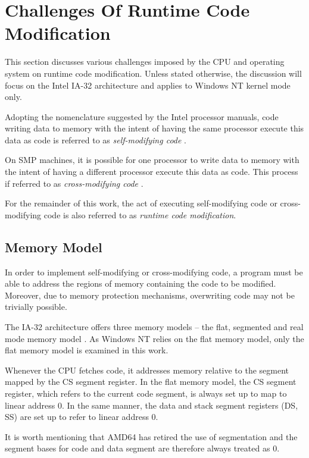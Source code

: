 

\chapter{Challenges Of Runtime Code Modification}
\label{sec:ChallengesOfRuntimeCodeModification}
This section discusses various challenges imposed by the CPU and operating
system on runtime code modification. Unless stated otherwise, the discussion 
will focus on the Intel IA-32 architecture and applies to Windows NT kernel mode only. 

Adopting the nomenclature suggested by the Intel processor manuals, 
code writing data to memory with the intent of having the same processor
execute this data as code is referred to as \emph{self-modifying code} \cite{intel07_3A}. 

On SMP machines, it is possible for one processor to write data to memory 
with the intent of having a different processor execute this data as code.
This process if referred to as \emph{cross-modifying code} \cite{intel07_3A}.

For the remainder of this work, the act of executing self-modifying code or
cross-modifying code is also referred to as \emph{runtime code modification}.

\section{Memory Model}
\label{sec:MemoryModel}
In order to implement self-modifying or cross-modifying code, a program must
be able to address the regions of memory containing the code to be modified. Moreover,
due to memory protection mechanisms, overwriting code may not be trivially possible.

The IA-32 architecture offers three memory models -- the flat, segmented and
real mode memory model \cite{intel07_1}. As Windows NT 
relies on the flat memory model, only the flat memory model is examined in this work.

Whenever the CPU fetches code, it addresses memory relative to the segment mapped by
the CS segment register. In the flat memory model, the CS segment register, which refers
to the current code segment, is always set up to map to linear address 0. In the 
same manner, the data and stack segment registers (DS, SS) are set up to refer to 
linear address 0.

It is worth mentioning that AMD64 has retired the use of segmentation \cite{amd64_2} 
and the segment bases for code and data segment are therefore always treated as 0.

